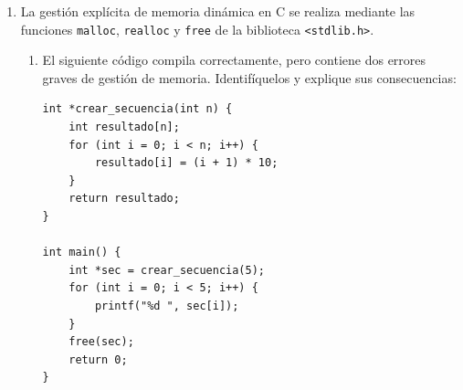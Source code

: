 \documentclass[11pt,letterpaper]{article}
\begin{document}
\begin{enumerate}[label=\textbf{\arabic*.}]
\begin{enumerate}[label=(\alph*), resume]
\begin{solucionbox}
        \begin{lstlisting}[style=customc]
void separar_pares_impares(const int *origen, int n,
    int *pares, int *np, int *impares, int *ni) {
    *np = 0;
    *ni = 0;

    for (int i = 0; i < n; i++) {
        if (origen[i] % 2 == 0) {
            pares[*np] = origen[i];
            (*np)++;
        } else {
            impares[*ni] = origen[i];
            (*ni)++;
        }
    }
}
        \end{lstlisting}
        \noindent \textbf{Puntos clave:}
        \begin{itemize}[noitemsep]
            \item Los contadores \texttt{*np} y \texttt{*ni} se inicializan a $0$ al inicio.
            \item Se usa el operador módulo (\texttt{\%~2}) para clasificar cada elemento.
            \item Los paréntesis en \texttt{(*np)++} son esenciales: sin ellos, la precedencia de \texttt{++} incrementaría el puntero en lugar del valor apuntado.
            \item \texttt{const} en \texttt{origen} garantiza que no se modifica el arreglo de entrada.
        \end{itemize}
        \end{solucionbox}
    \end{enumerate}

    \newpage
    \item La gestión explícita de memoria dinámica en C se realiza mediante las funciones \texttt{malloc}, \texttt{realloc} y \texttt{free} de la biblioteca \texttt{<stdlib.h>}.

    \begin{enumerate}[label=(\alph*)]
        \item El siguiente código compila correctamente, pero contiene dos errores graves de gestión de memoria. Identifíquelos y explique sus consecuencias:
        \begin{lstlisting}[style=customc]
int *crear_secuencia(int n) {
    int resultado[n];
    for (int i = 0; i < n; i++) {
        resultado[i] = (i + 1) * 10;
    }
    return resultado;
}

int main() {
    int *sec = crear_secuencia(5);
    for (int i = 0; i < 5; i++) {
        printf("%d ", sec[i]);
    }
    free(sec);
    return 0;
}
        \end{lstlisting}


\end{enumerate}
\end{enumerate}
\end{document}
